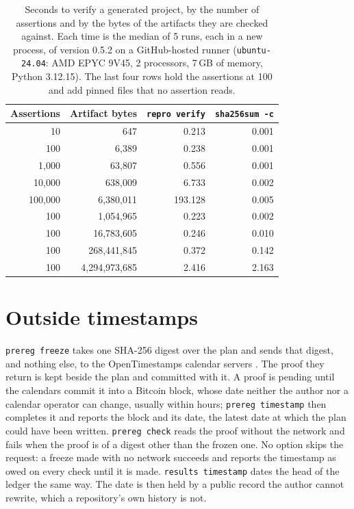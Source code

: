 \documentclass{article}
\newcommand{\code}[1]{\texttt{#1}}
\newcommand{\tVerifyCmd}{\code{repro verify}}
\begin{document}
\begin{table}[H]
\centering
\small
\caption{Seconds to verify a generated project, by the number of assertions and by the bytes of
the artifacts they are checked against. Each time is the median of 5 runs, each in a new process,
of version 0.5.2 on a GitHub-hosted runner (\code{ubuntu-24.04}: AMD EPYC 9V45, 2 processors,
7\,GB of memory, Python 3.12.15). The last four rows hold the assertions at 100 and add pinned
files that no assertion reads.}
\label{tab:timing}
\begin{tabular}{@{}rrrr@{}}
\toprule
\textbf{Assertions} & \textbf{Artifact bytes} & \textbf{\tVerifyCmd{}} & \textbf{\code{sha256sum -c}} \\
\midrule
10 & 647 & 0.213 & 0.001 \\
100 & 6{,}389 & 0.238 & 0.001 \\
1{,}000 & 63{,}807 & 0.556 & 0.001 \\
10{,}000 & 638{,}009 & 6.733 & 0.002 \\
100{,}000 & 6{,}380{,}011 & 193.128 & 0.005 \\
\midrule
100 & 1{,}054{,}965 & 0.223 & 0.002 \\
100 & 16{,}783{,}605 & 0.246 & 0.010 \\
100 & 268{,}441{,}845 & 0.372 & 0.142 \\
100 & 4{,}294{,}973{,}685 & 2.416 & 2.163 \\
\bottomrule
\end{tabular}
\end{table}



\section{Outside timestamps}
\label{sec:timestamps}

\code{prereg freeze} takes one SHA-256 digest over the plan and sends that digest, and nothing
else, to the OpenTimestamps calendar servers \citep{todd2016opentimestamps}. The proof they return
is kept beside the plan and committed with it. A proof is pending until the calendars commit it
into a Bitcoin block, whose date neither the author nor a calendar operator can change, usually
within hours; \code{prereg timestamp} then completes it and reports
the block and its date, the latest date at which the plan could have been written.
\code{prereg check} reads the proof without the network and fails when the proof is of a digest
other than the frozen one. No option skips the request: a freeze made with no network succeeds and
reports the timestamp as owed on every check until it is made. \code{results timestamp} dates the
head of the ledger the same way. The date is then held by a public record the author cannot
rewrite, which a repository's own history is not.





\clearpage

\end{document}
